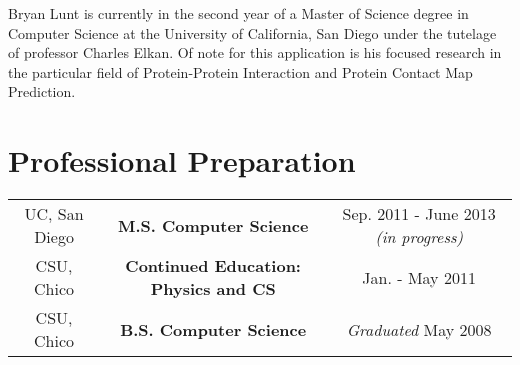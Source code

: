 

%

Bryan Lunt is currently in the second year of a Master of Science degree in Computer Science at the University of California, San Diego under the tutelage of professor Charles Elkan.
Of note for this application is his focused research in the particular field of Protein-Protein Interaction and Protein Contact Map Prediction.

\nocite{Morcos2011a,Procaccini2011a,Lunt2010a}
\section*{Professional Preparation}
\begin{tabular}{c c c}
UC, San Diego & {\bf M.S. Computer Science} & Sep. 2011 - June 2013 {\it (in progress)}\\
CSU, Chico & {\bf Continued Education: Physics and CS} & Jan. - May 2011\\
CSU, Chico & {\bf B.S. Computer Science}  & {\it Graduated} May 2008\\
\end{tabular}

